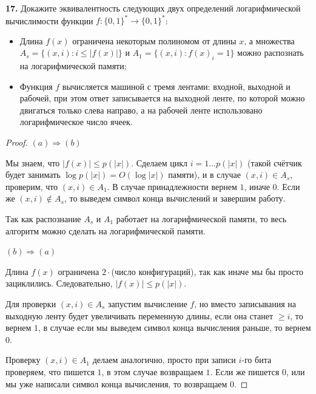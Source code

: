 \textbf{17.} Докажите эквивалентность следующих двух определений логарифмической вычислимости функции $f\colon \{0, 1\}^* \to \{0, 1\}^*$:
\begin{itemize}
    \item[(a)] Длина $f(x)$ ограничена некоторым полиномом от длины $x$, а множества $A_s = \{(x, i)\colon i \le |f(x)|\}$ и $A_1 = \{(x, i)\colon f(x)_i = 1\}$ можно распознать на логарифмической памяти;
    \item[(b)] Функция $f$ вычисляется машиной с тремя лентами: входной, выходной и рабочей, при этом ответ записывается на выходной ленте, по которой можно двигаться только слева направо, а на рабочей ленте использовано логарифмическое число ячеек.
\end{itemize}

\begin{proof}

$(a)\Rightarrow(b)$ 

Мы знаем, что $|f(x)|\le p(|x|)$. Сделаем цикл $i=1\ldots p(|x|)$ (такой счётчик будет занимать $\log{p(|x|)} = O(\log{|x|})$ памяти), и в случае $(x,i)\in A_s$, проверим, что $(x,i)\in A_1$. В случае принадлежности вернем $1$, иначе $0$. Если же $(x,i)\not\in A_s$, то выведем символ конца вычислений и завершим работу. 

Так как распознание $A_s$ и $A_1$ работает на логарифмической памяти, то весь алгоритм можно сделать на логарифмической памяти.


$(b)\Rightarrow(a)$

Длина $f(x)$ ограничена $2\cdot$(число конфигураций), так как иначе мы бы просто зациклились. Следовательно, $|f(x)|\le p(|x|)$.

Для проверки $(x,i)\in A_s$ запустим вычисление $f$, но вместо записывания на выходную ленту будет увеличивать переменную длины, если она станет $\ge i$, то вернем $1$, в случае если мы выведем символ конца вычисления раньше, то вернем $0$.

Проверку $(x,i)\in A_1$ делаем аналогично, просто при записи $i$-го бита проверяем, что пишется $1$, в этом случае возвращаем $1$. Если же пишется $0$, или мы уже написали символ конца вычисления, то возвращаем $0$.

\end{proof}